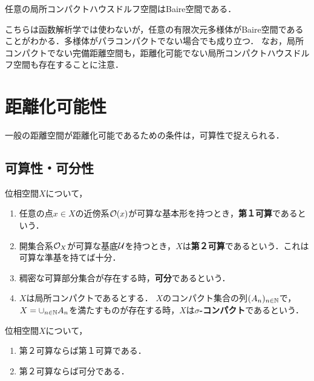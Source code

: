 \documentclass[uplatex,dvipdfmx]{jsreport}
\begin{document}
\begin{proposition}[BCT2]
    任意の局所コンパクトハウスドルフ空間はBaire空間である．
\end{proposition}
\begin{remarks}
    こちらは函数解析学では使わないが，任意の有限次元多様体がBaire空間であることがわかる．多様体がパラコンパクトでない場合でも成り立つ．
    なお，局所コンパクトでない完備距離空間も，距離化可能でない局所コンパクトハウスドルフ空間も存在することに注意．
\end{remarks}

\section{距離化可能性}

\begin{tcolorbox}[colframe=ForestGreen, colback=ForestGreen!10!white,breakable,colbacktitle=ForestGreen!40!white,coltitle=black,fonttitle=\bfseries\sffamily,
title=]
    一般の距離空間が距離化可能であるための条件は，可算性で捉えられる．
\end{tcolorbox}

\subsection{可算性・可分性}

\begin{definition}
    位相空間$X$について，
    \begin{enumerate}
        \item 任意の点$x\in X$の近傍系$\mathcal{O}(x)$が可算な基本形を持つとき，\textbf{第１可算}であるという．
        \item 開集合系$\mathcal{O}_X$が可算な基底$\mathcal{U}$を持つとき，$X$は\textbf{第２可算}であるという．これは可算な準基を持てば十分．
        \item 稠密な可算部分集合が存在する時，\textbf{可分}であるという．
        \item $X$は局所コンパクトであるとする．
        $X$のコンパクト集合の列$(A_n)_{n\in\mathbb{N}}$で，$X=\cup_{n\in\mathbb{N}}A_n$を満たすものが存在する時，$X$は\textbf{$\sigma$-コンパクト}であるという．
    \end{enumerate}
\end{definition}

\begin{proposition}
    位相空間$X$について，
    \begin{enumerate}
        \item 第２可算ならば第１可算である．
        \item 第２可算ならば可分である．
    \end{enumerate}
\end{proposition}
\end{document}
